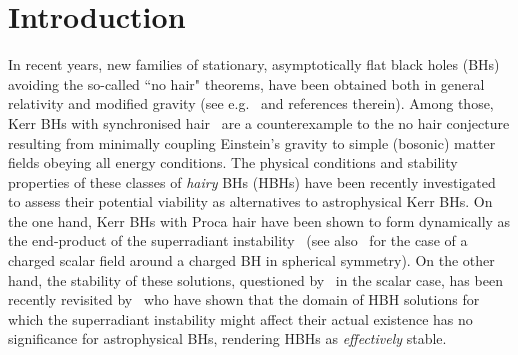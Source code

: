 \documentclass[twocolumn,aps,showpacs,showkeys,prd,superscriptaddress,byrevtex, amsmath]{revtex4-1}
\begin{document}




\maketitle



\section{Introduction}

In recent years, new families of stationary, asymptotically flat black holes (BHs) avoiding the so-called ``no hair" theorems, have been obtained both in general relativity and modified gravity (see e.g.~\cite{Herdeiro:2015_review} and references therein). Among those, Kerr BHs with synchronised hair~\cite{Herdeiro:2014a,Herdeiro:2016} are a counterexample to the no hair conjecture resulting from minimally coupling Einstein's gravity to simple (bosonic) matter fields obeying all energy conditions. The physical conditions and stability properties of these classes of {\it hairy} BHs  (HBHs) have been recently investigated to assess their potential viability as  alternatives to astrophysical Kerr BHs.  On the one hand, Kerr BHs with Proca hair have been shown to form dynamically as the end-product of the superradiant instability~\cite{East:2017,Herdeiro:2017} (see also~\cite{Sanchis-Gual:2016,Bosch:2016} for the case of a charged scalar field around a charged BH in spherical  symmetry). On the other hand, the stability of these solutions, questioned by~\cite{Ganchev:2018} in the scalar case, has been recently revisited by~\cite{Degollado:2018} who have shown that the domain of HBH solutions for which the superradiant instability might affect their actual existence has no significance for astrophysical BHs, rendering HBHs as {\it effectively} stable.
\end{document}
